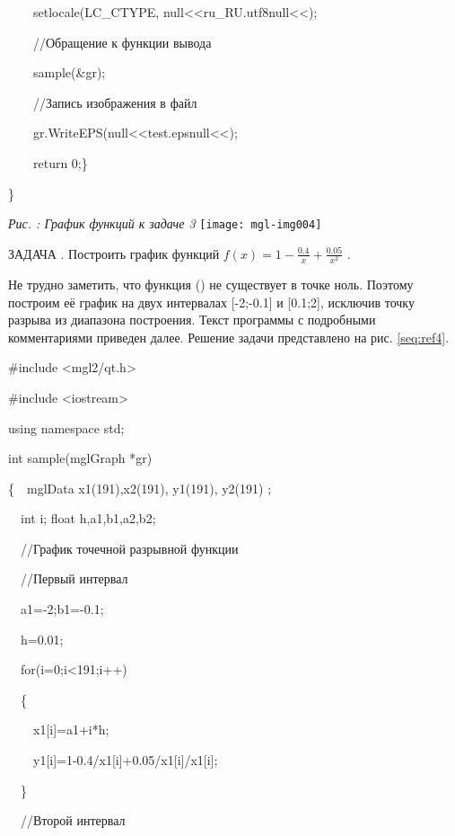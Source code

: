 {\upshape
\ \ \ \ setlocale(LC\_CTYPE, null{<<}ru\_RU.utf8null{<<});}

{\upshape
\ \ \ \ //Обращение к функции вывода}

{\upshape
\ \ \ \ sample(\&gr);}

{\upshape
\ \ \ \ //Запись изображения в файл}

{\upshape
\ \ \ \ gr.WriteEPS(null{<<}test.epsnull{<<});}

{\upshape
\ \ \ \ return 0;\}}

{\upshape
\}}

{\centering \begin{minipage}{14.864cm}
{\itshape
Рис. {\theqwertya\label{seq:ref3}}: График функций к задаче 3}
\texttt{[image: mgl-img004]}\end{minipage}\par}

ЗАДАЧА {\theqwerty\label{seq:ref3a}}. Построить график функций 
$f(x)=1-\frac{0.4}{x}+\frac{0.05}{x^{2}}$ .

Не трудно заметить, что функция () не существует в точке ноль. Поэтому
построим её график на двух интервалах [-2;-0.1] и [0.1;2], исключив точку разрыва из диапазона построения. Текст
программы с подробными комментариями приведен далее. Решение задачи представлено на рис. \ref{seq:ref4}.

\#include {\textless}mgl2/qt.h{\textgreater}

\#include {\textless}iostream{\textgreater}

using namespace std;

int sample(mglGraph *gr)

\{\ \ mglData x1(191),x2(191), y1(191), y2(191) ;

\ \ int i; float h,a1,b1,a2,b2;

\ \ //График точечной разрывной функции

{\upshape
\ \ //Первый интервал}

\ \ a1=-2;b1=-0.1;

\ \ h=0.01;

\ \ for(i=0;i{\textless}191;i++)

\ \ \{

\ \ \ \ x1[i]=a1+i*h;

\ \ \ \ y1[i]=1-0.4/x1[i]+0.05/x1[i]/x1[i];

\ \ \}

\ \ //Второй интервал

